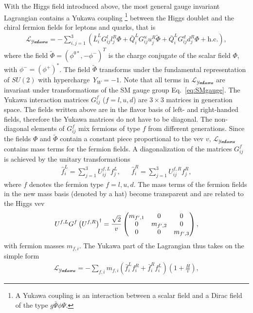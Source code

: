 With the Higgs field introduced above, the most general gauge
invariant Lagrangian contains a Yukawa coupling \footnote{A Yukawa
  coupling is an interaction between a scalar field and a Dirac
  field of the type $g\bar{\Psi}\phi\Psi$.} between the Higgs
doublet and the chiral fermion fields for leptons and quarks, that is 
\begin{align}\label{eq:yuklag}
  \mathcal{L_{\text{Yukawa}}} = - \sum_{i,j = 1}^3\left(\bar{L}_{i}^L
    G_{ij}^ll^{R}_j\Phi +\bar{Q}_{i}^L G_{ij}^uu_{j}^R\tilde \Phi
    +\bar{Q}_{i}^L G_{ij}^dd_{j}^R\Phi +\text{h.c.}\right),
\end{align}
where the field $\tilde \Phi = (\phi^{0*},-\phi^-)^T$ is the charge conjugate of
the scalar field $\Phi$, with $\phi^-=(\phi^+)^*$. The field $\tilde
\Phi$ transforms under the fundamental representation of $SU(2)$ with
hypercharge~$Y_W=-1$. Note that all terms in
$\mathcal{L_{\text{Yukawa}}}$ are invariant under transformations of
the SM gauge group Eq.~\eqref{eq:SMgauge}. The Yukawa interaction
matrices $G_{ij}^f$ ($f=l,u,d$) are
$3\times 3$ matrices in generation space. The fields written above are
in the flavor basis of left- and right-handed fields, therefore the Yukawa
matrices do not have to be diagonal. The non-diagonal elements of
$G_{ij}^f$ mix fermions of type $f$ from different generations. Since the fields $\Phi$ and $\tilde \Phi$ contain a constant piece
proportional to the vev $v$, $\mathcal{L_{\text{Yukawa}}}$ contains
mass terms for the fermion fields. A diagonalization of the matrices
$G^f_{ij}$ is achieved by the unitary transformations
\begin{align}\label{eq:trafomb}
  \hat{f}_i^{L}=\sum_{j = 1}^3U_{ij}^{f,L}f_j^{L},&&  \hat{f}_i^{R}=\sum_{j = 1}^3U_{ij}^{f,R}f_j^{R},
\end{align}
where $f$ denotes the fermion type $f=l, u, d$. The mass terms of
the fermion fields in the new mass basis (denoted by a hat) become
transparent and are related to the Higgs vev
\begin{align}\label{eq:diagyuk}
 U^{f,L}G^{f}\left(U^{{f},R}\right)^\dagger =
 \frac{\sqrt{2}}{v} \pmqty{m_{f^\prime,1} &0&0\\0&m_{f^\prime,2}&0\\0&0&m_{f^\prime,3} }, 
\end{align}
with fermion masses $m_{f,i}$. The Yukawa part of the Lagrangian thus takes on the simple form
\begin{align}
    \mathcal{L_{\text{Yukawa}}} = - \sum_{f,i}m_{f,i}\left(\bar{f}^L_i f^R_i
      +\bar{f}^R_i f^{L}_i\right)\left(1+\frac{H}{v}\right),
\end{align}
